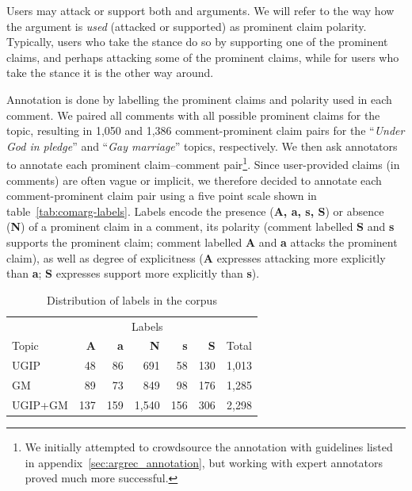 Users may attack or support both  and  arguments. 
We will refer to the way how the argument is \textit{used} (attacked or supported)
as prominent claim polarity. 
Typically, users who take the  stance do so by supporting one of the 
prominent claims, and perhaps attacking some of the  prominent claims, while
for users who take the  stance it is the other way around. 


Annotation is done by labelling the prominent claims and polarity  
used in each comment. 
We paired all comments with all possible prominent claims for the topic, resulting in
1,050 and 1,386 comment-prominent claim pairs for the ``\emph{Under God
in pledge}'' and ``\emph{Gay marriage}'' topics, respectively. 
We then ask annotators to annotate each prominent claim--comment 
pair\footnote{
We 
initially attempted to crowdsource the annotation with guidelines listed in 
appendix~\ref{sec:argrec_annotation}, but working with expert annotators 
proved much more successful. }.
Since user-provided claims (in comments) are often vague or implicit, we therefore decided to
annotate each comment-prominent claim pair using a five point scale shown in 
table~\ref{tab:comarg-labels}. Labels encode the presence (\textbf{A, a, s, S})
or absence (\textbf{N}) of a prominent claim in a comment, its polarity
(comment labelled \textbf{S} and \textbf{s} supports the prominent claim; comment labelled
\textbf{A} and \textbf{a} attacks the prominent claim),
as well as degree of 
explicitness (\textbf{A} expresses attacking more explicitly than \textbf{a};
\textbf{S} expresses support
more explicitly than \textbf{s}). 

\begin{table}
\centering
{\small
\begin{tabular}{lrrrrrr}
\toprule
& \multicolumn{5}{c}{Labels}\\
\cmidrule(lr){2-6}
Topic & \textbf{A} & \textbf{a} & \textbf{N} & \textbf{s} & \textbf{S} & Total \\
\midrule
UGIP         & 48  & 86 & 691 & 58 & 130 & 1,013 \\
GM           & 89 & 73 & 849 & 98 & 176 & 1,285 \\
UGIP+GM      & 137 & 159 &1,540 & 156& 306 & 2,298 \\
\bottomrule
\end{tabular}
}
\caption{Distribution of labels in the \ComArg corpus}
\label{tab:labels}
\end{table}

